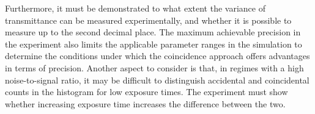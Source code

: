 Furthermore, it must be demonstrated to what extent the variance of transmittance can be measured experimentally, and whether it is possible to measure up to the second decimal place. The maximum achievable precision in the experiment also limits the applicable parameter ranges in the simulation to determine the conditions under which the coincidence approach offers advantages in terms of precision. \newline
Another aspect to consider is that, in regimes with a high noise-to-signal ratio, it may be difficult to distinguish accidental and coincidental counts in the histogram for low exposure times. The experiment must show whether increasing exposure time increases the difference between the two. 


